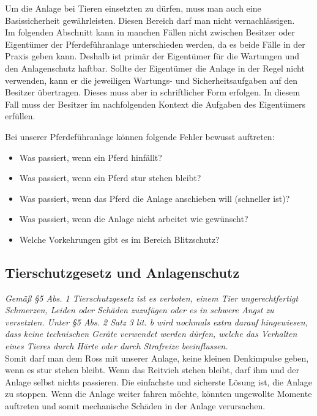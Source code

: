 Um die Anlage bei Tieren einsetzten zu dürfen, muss man auch eine Basissicherheit gewährleisten.
Diesen Bereich darf man nicht vernachlässigen. \\ Im folgenden Abschnitt kann in manchen Fällen nicht zwischen Besitzer oder Eigentümer der Pferdeführanlage unterschieden werden, da es beide Fälle in der Praxis geben kann. Deshalb ist primär der Eigentümer für die Wartungen und den Anlagenschutz haftbar. Sollte der Eigentümer die Anlage in der Regel nicht verwenden, kann er die jeweiligen Wartungs- und Sicherheitsaufgaben auf den Besitzer übertragen. Dieses muss aber in schriftlicher Form erfolgen. In diesem Fall muss der Besitzer im nachfolgenden Kontext die Aufgaben des Eigentümers erfüllen.

Bei unserer Pferdeführanlage können folgende Fehler bewusst auftreten:

\begin{itemize}
\item{Was passiert, wenn ein Pferd hinfällt?}
\item{Was passiert, wenn ein Pferd stur stehen bleibt?}
\item{Was passiert, wenn das Pferd die Anlage anschieben will (schneller ist)?}
\item{Was passiert, wenn die Anlage nicht arbeitet wie gewünscht?}
\item{Welche Vorkehrungen gibt es im Bereich Blitzschutz?}
\end{itemize}

\subsection{Tierschutzgesetz und Anlagenschutz}
\label{sec:tierschutzgesetzUndAnlagenschutz}

\emph{Gemäß §5 Abs. 1 Tierschutzgesetz ist es verboten, 
einem Tier ungerechtfertigt Schmerzen, Leiden oder Schäden zuzufügen oder es in schwere Angst zu versetzten. 
Unter §5 Abs. 2 Satz 3 lit. b wird nochmals extra darauf hingewiesen, dass keine technischen Geräte verwendet werden dürfen, welche das Verhalten eines Tieres durch Härte oder durch Strafreize beeinflussen.} \cite{tierschutzgesetz} \\

Somit darf man dem Ross mit unserer Anlage, keine kleinen Denkimpulse geben, wenn es stur stehen bleibt. Wenn das Reitvieh stehen bleibt, darf ihm und der Anlage selbst nichts passieren. Die einfachste und sicherste Lösung ist, die Anlage zu stoppen. Wenn die Anlage weiter fahren möchte, könnten ungewollte Momente auftreten und somit mechanische Schäden in der Anlage verursachen.

